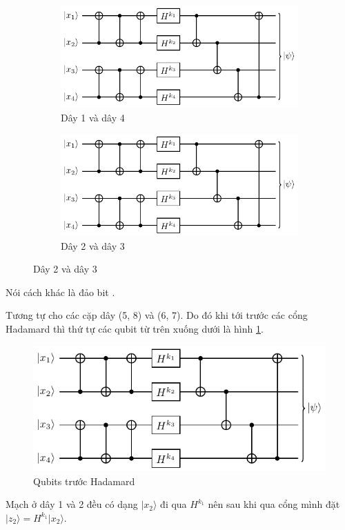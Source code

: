 \begin{figure}[ht]
    \centering
    \begin{subfigure}{0.3\textwidth}
        \includegraphics[page=4]{nsucrypto/problem10_figures.pdf}
        \caption{Dây 1 và dây 4}
    \end{subfigure}
    \begin{subfigure}{0.3\textwidth}
        \includegraphics[page=5]{nsucrypto/problem10_figures.pdf}
        \caption{Dây 2 và dây 3}
    \end{subfigure}
\end{figure}

Nói cách khác là đảo bit .

Tương tự cho các cặp dây (5, 8) và (6, 7). Do đó khi tới trước các cổng Hadamard thì thứ tự các qubit từ trên xuống dưới là hình \ref{nsucrypto23:p10_4}.

\begin{figure}[ht]
    \centering
    \includegraphics[page=6]{nsucrypto/problem10_figures.pdf}
    \caption{Qubits trước Hadamard}
    \label{nsucrypto23:p10_4}
\end{figure}
Mạch ở dây 1 và 2 đều có dạng $\lvert x_2 \rangle$ đi qua $H^{k_1}$ nên sau khi qua cổng mình đặt $\lvert z_2 \rangle = H^{k_1} \lvert x_2 \rangle$.

